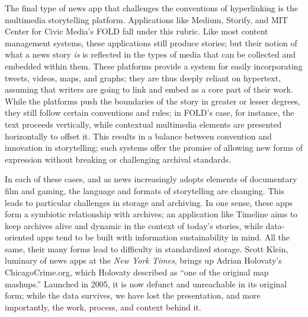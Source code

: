 The final type of news app that challenges the conventions of hyperlinking is the multimedia storytelling platform. Applications like Medium, Storify, and MIT Center for Civic Media's FOLD fall under this rubric. Like most content management systems, these applications still produce stories; but their notion of what a news story \emph{is} is reflected in the types of media that can be collected and embedded within them. These platforms provide a system for easily incorporating tweets, videos, maps, and graphs; they are thus deeply reliant on hypertext, assuming that writers are going to link and embed as a core part of their work. While the platforms push the boundaries of the story in greater or lesser degrees, they still follow certain conventions and rules; in FOLD's case, for instance, the text proceeds vertically, while contextual multimedia elements are presented horizontally to offset it. This results in a balance between convention and innovation in storytelling; such systems offer the promise of allowing new forms of expression without breaking or challenging archival standards.

In each of these cases, and as news increasingly adopts elements of documentary film and gaming, the language and formats of storytelling are changing. This leads to particular challenges in storage and archiving. In one sense, these apps form a symbiotic relationship with archives; an application like Timeline aims to keep archives alive and dynamic in the context of today's stories, while data-oriented apps tend to be built with information sustainability in mind. All the same, their many forms lead to difficulty in standardized storage. Scott Klein, luminary of news apps at the \emph{New York Times}, brings up Adrian Holovaty's ChicagoCrime.org, which Holovaty described as ``one of the original map mashups.''\autocite{holovaty_memory_2008} Launched in 2005, it is now defunct and unreachable in its original form; while the data survives, we have lost the presentation, and more importantly, the work, process, and context behind it.

